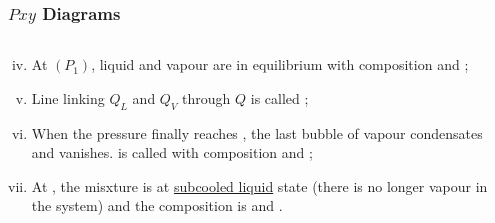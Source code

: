 \documentclass[10pt,compress,handout,ignorenonframetext,unknownkeysallowed]{beamer}
\begin{document}
\begin{frame}
  \frametitle{$Pxy$ Diagrams}
  \begin{columns}
     \begin{column}[l]{0.5\linewidth}
       \begin{enumerate}[i)]\setcounter{enumi}{3}
          \item<1-> At  $\left(P_{1}\right)$, liquid and vapour are in equilibrium with composition \red{$\left[x_{1}=x_{\text{Q}}; y_{1}=y_{\text{Q}}\right]$} and \blue{$\left[x_{2}=1-x_{1}; y_{2}=1-y_{1}\right]$};
          \item<2-> Line linking $Q_{L}$ and $Q_{V}$ through $Q$ is called {\bf {}};
          \item<3-> When the pressure finally reaches , the last bubble of vapour condensates and vanishes.  is called {\bf {}} with composition \red{$\left[x_{1}=x_{\text{z}}; y_{1}=y_{\text{BP}}\right]$} and \blue{$\left[x_{2}=1-x_{1}; y_{2}=1-y_{1}\right]$};
          \item<4-> At , the misxture is at \underline{subcooled liquid} state (\ie there is no longer vapour in the system) and the composition is \red{$\left[x_{1}=x_{\text{z}}; y_{1}=0\right]$} and \blue{$\left[x_{2}=1-x_{1}; y_{2}=0\right]$}.
       \end{enumerate}
     \end{column}
     \begin{column}[l]{0.5\linewidth} 
     \end{column}
  \end{columns}
\end{frame}
\normalsize
\end{document}
